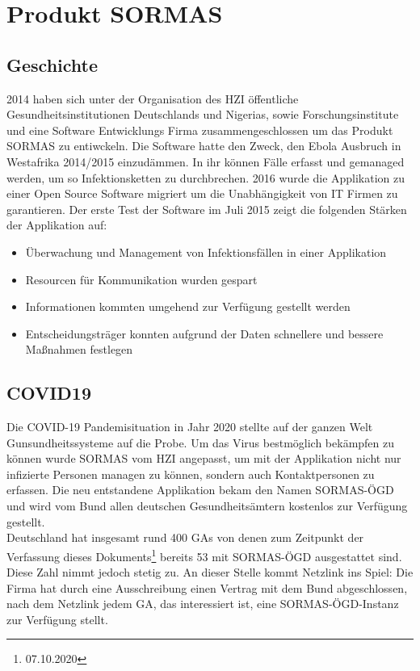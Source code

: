 \section{Produkt SORMAS}
\subsection{Geschichte}
2014 haben sich unter der Organisation des \ac{HZI} öffentliche Gesundheitsinstitutionen Deutschlands und Nigerias, sowie Forschungsinstitute und eine Software Entwicklungs Firma zusammengeschlossen um das Produkt \ac{SORMAS} zu entiwckeln.
Die Software hatte den Zweck, den Ebola Ausbruch in Westafrika 2014/2015 einzudämmen.
In ihr können Fälle erfasst und gemanaged werden, um so Infektionsketten zu durchbrechen.
2016 wurde die Applikation zu einer Open Source Software migriert um die Unabhängigkeit von IT Firmen zu garantieren.
Der erste Test der Software im Juli 2015 zeigt die folgenden Stärken der Applikation auf:
\begin{itemize}
    \item Überwachung und Management von Infektionsfällen in einer Applikation
    \item Resourcen für Kommunikation wurden gespart
    \item Informationen kommten umgehend zur Verfügung gestellt werden
    \item Entscheidungsträger konnten aufgrund der Daten schnellere und bessere Maßnahmen festlegen
\end{itemize}
\cite{SORMAS_history}

\subsection{COVID19}
Die \ac{COVID-19} Pandemisituation in Jahr 2020 stellte auf der ganzen Welt Gunsundheitssysteme auf die Probe. 
Um das Virus bestmöglich bekämpfen zu können wurde \ac{SORMAS} vom \ac{HZI} angepasst, um mit der Applikation nicht nur infizierte Personen managen zu können, sondern auch Kontaktpersonen zu erfassen.
Die neu entstandene Applikation bekam den Namen \ac{SORMAS-ÖGD} und wird vom Bund allen deutschen Gesundheitsämtern kostenlos zur Verfügung gestellt. 
\cite{SORMAS_covid}
\\
Deutschland hat insgesamt rund 400 \ac{GAs} \cite{GAs} von denen zum Zeitpunkt der Verfassung dieses Dokuments\footnote{07.10.2020} bereits 53 mit \ac{SORMAS-ÖGD} ausgestattet sind.
Diese Zahl nimmt jedoch stetig zu.  
An dieser Stelle kommt Netzlink ins Spiel: 
Die Firma hat durch eine Ausschreibung einen Vertrag mit dem Bund abgeschlossen, nach dem Netzlink jedem \ac{GA}, das interessiert ist, eine \ac{SORMAS-ÖGD}-Instanz zur Verfügung stellt.

